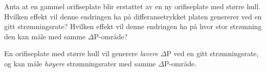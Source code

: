 

Anta at en gammel orifiseplate blir erstattet av en ny orifiseplate med større hull. Hvilken effekt vil denne endringen ha på differansetrykket platen genererer ved en gitt strømningsrate? Hvilken effekt vil denne endringen ha på hvor stor strømning den kan måle med samme $\Delta$P-område?







En orifiseplate med større hull vil generere {\it lavere} $\Delta$P ved en gitt strømningsrate, og kan måle {\it høyere} strømningsrater med samme $\Delta$P-område.










